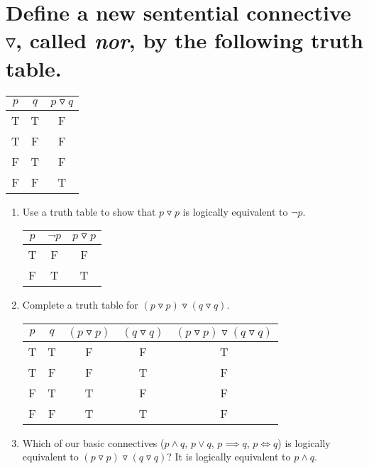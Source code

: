 \documentclass[11pt]{article} %
\begin{document}
\section{Define a new sentential connective $\triangledown$, called \textit{nor}, by the following truth table.}
	\begin{center}
	\begin{tabular}{|c|c|c|}
	\hline
	$p$ & $q$ & $p \triangledown q$\\
	\hline
	T & T & F\\
	T & F & F\\
	F & T & F\\
	F & F & T\\
	\hline
	\end{tabular}
	\end{center}
	\begin{enumerate}
	\item Use a truth table to show that $p \triangledown p$ is logically equivalent to $\neg p$.
	\begin{center}
	\begin{tabular}{|c|c|c|}
	\hline
	$p$ & $\neg p$ & $p\triangledown p$\\
	\hline
	T & F & F\\
	F & T & T\\
	\hline
	\end{tabular}
	\end{center}
	\item Complete a truth table for $(p \triangledown p) \triangledown (q \triangledown q)$.
	\begin{center}
	\begin{tabular}{|c|c|c|c|c|}
	\hline
	$p$ & $q$ & $(p \triangledown p)$ & $(q \triangledown q)$ & $(p \triangledown p) \triangledown (q \triangledown q)$\\
	\hline
	T & T & F & F & T\\
	T & F & F & T & F\\
	F & T & T & F & F\\
	F & F & T & T & F\\
	\hline
	\end{tabular}
	\end{center}
	\item Which of our basic connectives ($p\land q$, $p\lor q$, $p\implies q$, $p\iff q$) is logically equivalent to $(p \triangledown p) \triangledown (q \triangledown q)$?
	\subitem It is logically equivalent to $p \land q$.
	\end{enumerate}
	
\end{document}
